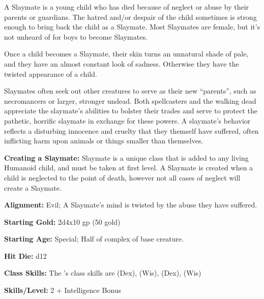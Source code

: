 
A Slaymate is a young child who has died because of neglect or abuse by their parents or guardians. The hatred and/or despair of the child sometimes is strong enough to bring back the child as a Slaymate. Most Slaymates are female, but it's not unheard of for boys to become Slaymates.

Once a child becomes a Slaymate, their skin turns an unnatural shade of pale, and they have an almost constant look of sadness. Otherwise they have the twisted appearance of a child.

Slaymates often seek out other creatures to serve as their new “parents”, such as necromancers or larger, stronger undead. Both spellcasters and the walking dead appreciate the slaymate’s abilities to bolster their trades and serve to protect the pathetic, horrific slaymate in exchange for these powers. A slaymate’s behavior reflects a disturbing innocence and cruelty that they themself have suffered, often inflicting harm upon animals or things smaller than themselves.

\textbf{Creating a Slaymate:} Slaymate is a unique class that is added to any living Humanoid child, and must be taken at first level. A Slaymate is created when a child is neglected to the point of death, however not all cases of neglect will create a Slaymate.

\textbf{Alignment:} Evil; A Slaymate's mind is twisted by the abuse they have suffered.

\textbf{Starting Gold:} 2d4x10 gp (50 gold)

\textbf{Starting Age:} Special; Half of complex of base creature.

\textbf{Hit Die:} d12

\textbf{Class Skills:} The \currentclassname{}'s class skills are  (Dex),  (Wis),  (Dex),  (Wis)

\textbf{Skills/Level:} 2 + Intelligence Bonus

\poorbab{}
\poorfor{}
\goodref{}
\goodwil{}

\begin{classtable}
\end{classtable}

\classfeatures

